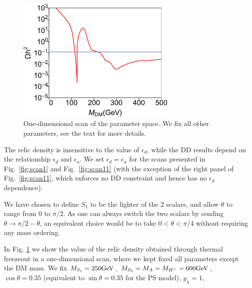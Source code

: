 \begin{figure}
\begin{center}
\includegraphics[width=0.7\textwidth]{texinputs/05_relic/figures/relic_scalar/RelicPlot.pdf}
\caption{One-dimensional scan of the parameter space. We fix all other parameters, see the text for more details.} 
\label{fig:scalarrelic1D}
\end{center}
\end{figure}

The relic density is insensitive to the value of $\epsilon_d$, while the DD results depend on the relationship $\epsilon_d$ and $\epsilon_u$.  
We set $\epsilon_d = \epsilon_u$ for the scans presented in Fig.~\ref{fig:scan1} and Fig.~\ref{fig:scan11} (with the exception of the right panel of Fig.~\ref{fig:scan11}, which enforces no DD constraint and hence has no $\epsilon_d$ dependence). 

We have chosen to define $S_1$ to be the lighter of the 2 scalars, and allow $\theta$ to range from $0$ to $\pi/2$. As one can always switch the two scalars by sending $\theta\rightarrow\pi/2-\theta$, an equivalent choice would be to take $0<\theta<\pi/4$ without requiring any mass ordering.

In Fig. \ref{fig:scalarrelic1D} we show the value of the relic density obtained through thermal freezeout in a one-dimensional scan, where we kept fixed all parameters except the DM mass. We fix $M_{S_1}=250\textrm{GeV}$, $M_{S_2}=M_A=M_{H^+}=600\textrm{GeV}$, $\cos\theta=0.35$ (equivalent to $\sin\theta=0.35$ for the PS model), $y_\chi=1$, 



